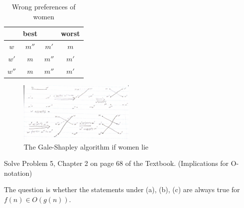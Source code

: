 \documentclass[12pt]{article}
\newenvironment{solution}[2][Solution]{\begin{trivlist}
\item[\hskip \labelsep {\bfseries #1}]}{\end{trivlist}}
\newenvironment{problem}[2][Problem]{\begin{trivlist}
\item[\hskip \labelsep {\bfseries #1}\hskip \labelsep {\bfseries #2.}]}{\end{trivlist}}
\begin{document}
\begin{solution}{}
\begin{table}[h!]
\centering
\begin{tabular}{ |c|c|c|c| } 
 \hline
 & best & & worst \\
 \hline
 $w$ & $m''$ & {\color{red} $m'$} & {\color{red} $m$} \\ 
 \hline
 $w'$ & $m$ & $m''$ & $m'$ \\ 
 \hline
 $w''$ & $m$ & $m''$ & $m'$ \\ 
 \hline
\end{tabular}
\caption{Wrong preferences of women}
\label{table:falsepref}
\end{table}

\begin{figure}[H]
 \centering
 \includegraphics[width=0.50\textwidth]{fig3.pdf}
 \caption{The Gale-Shapley algorithm if women lie
 \label{fig:wrong}}
\end{figure}

\end{solution}

\begin{problem}{5}
Solve Problem 5, Chapter 2 on page 68 of the Textbook. (Implications for O-notation)

The question is whether the statements under (a), (b), (c) are always true for $f(n) \in O(g(n))$.
\end{problem}
\end{document}
